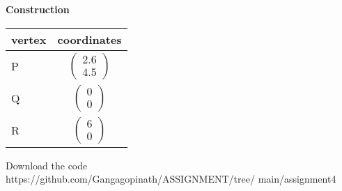 \documentclass[10pt,a4paper]{article}
\begin{document}
\begin{multicols}{2}
{\begin{center}
\begin{tabular}{|l|c|}
    \hline
      \end{tabular}
  \end{center} \vspace{2mm} 



  \vspace{2mm} \textbf{Construction}
\begin{center}
\setlength{\arrayrulewidth}{0.5mm}
\setlength{\tabcolsep}{6pt}
\renewcommand{\arraystretch}{1.5}
    \begin{tabular}{|l|c|}
  \hline 
  \textbf{vertex} & \textbf{coordinates} \\ \hline
P & $ \begin{pmatrix} 
2.6 \\
4.5
\end{pmatrix} $ \\ \hline
   Q & $\begin{pmatrix}
0 \\
0
\end{pmatrix}$   \\\hline
   R & $\begin{pmatrix}
6 \\
0
\end{pmatrix} $\\
   \hline
    \end{tabular}
\end{center}
  
  
 
\raggedright  Download the code \\
https://github.com/Gangagopinath/ASSIGNMENT/tree/
\newline
main/assignment4
}  \end{multicols}
\end{document}
